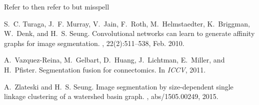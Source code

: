 

Refer to \cite{turaga2010affinity} then refer to \cite{vazquez11} but misspell \cite{zlateskiS15_asdf}

\begin{thebibliography}{}

S.~C. Turaga, J.~F. Murray, V.~Jain, F.~Roth, M.~Helmstaedter, K.~Briggman,
  W.~Denk, and H.~S. Seung.
\newblock Convolutional networks can learn to generate affinity graphs for
  image segmentation.
, 22(2):511--538, Feb. 2010.

A.~Vazquez-Reina, M.~Gelbart, D.~Huang, J.~Lichtman, E.~Miller, and H.~Pfister.
\newblock Segmentation fusion for connectomics.
\newblock In {\em ICCV}, 2011.

A.~Zlateski and H.~S. Seung.
\newblock Image segmentation by size-dependent single linkage clustering of a
  watershed basin graph.
, abs/1505.00249, 2015.

\end{thebibliography}

